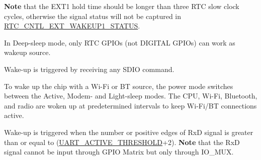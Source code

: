 \begin{table}[H]
\begin{threeparttable}
\begin{tablenotes}
        {\bfseries Note} that the EXT1 hold time should be longer than three RTC slow clock cycles, otherwise the signal status will not be captured in \hyperref[regdesc:RTCCNTLEXTWAKEUP1STATUSREG]{RTC\_CNTL\_EXT\_WAKEUP1\_STATUS}.
        \item[4] In Deep-sleep mode, only RTC GPIOs (not DIGITAL GPIOs) can work as wakeup source.
        \item[5] Wake-up is triggered by receiving any SDIO command.
        \item[6] To wake up the chip with a Wi-Fi or BT source, the power mode switches between the Active, Modem- and Light-sleep modes. The CPU, Wi-Fi, Bluetooth, and radio are woken up at predetermined intervals to keep Wi-Fi/BT connections active.
        \item [7] Wake-up is triggered when the number or positive edges of RxD signal is greater than or equal to (\hyperref[UARTACTIVETHRESHOLD]{UART\_ACTIVE\_THRESHOLD}+2). {\bfseries Note} that the RxD signal cannot be input through GPIO Matrix but only through IO\_MUX.
    \end{tablenotes}
    \end{threeparttable}
\end{table}
